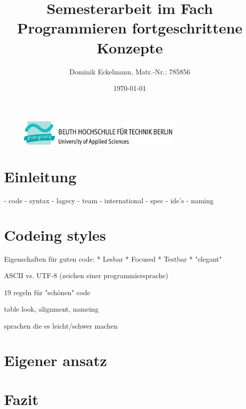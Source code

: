 \documentclass[a4paper]{article}
\title{Semesterarbeit im Fach Programmieren fortgeschrittene Konzepte}
\author{Dominik Eckelmann, Matr.-Nr.: 785856}
\date{\today}
\begin{document}
\sloppy

\begin{figure}[H]
	\centering
	\includegraphics[width=0.7\textwidth]{beuth.eps}
	\maketitle
\end{figure}

\newpage
\tableofcontents

\newpage
\section{Einleitung}

 - code
 - syntax
 - lagecy
 - team
 - international
 - spec
 - ide's
 - naming



\section{Codeing styles}

Eigenschaften für guten code: \cite{Heusser}
  * Lesbar
  * Focused
  * Testbar
  * "elegant"

ASCII vs. UTF-8 (zeichen einer programmiersprache) \cite{Kamp}

19 regeln für "schönen" code \cite{Peters}

table look, alignment, nameing \cite{Green}

sprachen die es leicht/schwer machen \cite{spinellis}

\section{Eigener ansatz}

\section{Fazit}

\appendix

\newpage

\nocite{*}

\printbibliography
{}

\newpage
{}
\listoffigures

\newpage
{}
\renewcommand\listoflistingscaption{Quellcodeverzeichnis}
\listoflistings
\end{document}
